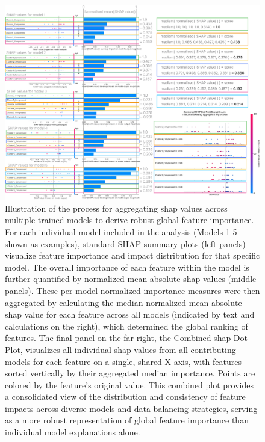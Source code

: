 \documentclass[12pt,a4paper]{report}
\begin{document}
\begin{figure}[h!]
  \centering
  \hspace*{-1.5cm}
  \includegraphics[width=1.2\textwidth]{images/SHAP-aggregate.png}
  \caption[Aggregation of \gls{shap} Values Across Multiple Models]{Illustration of the process for aggregating \gls{shap} values across multiple trained models to derive robust global feature importance. For each individual model included in the analysis (Models 1-5 shown as examples), standard SHAP summary plots (left panels) visualize feature importance and impact distribution for that specific model. The overall importance of each feature within the model is further quantified by normalized mean absolute \gls{shap} values (middle panels). These per-model normalized importance measures were then aggregated by calculating the median normalized mean absolute \gls{shap} value for each feature across all models (indicated by text and calculations on the right), which determined the global ranking of features. The final panel on the far right, the Combined \gls{shap} Dot Plot, visualizes all individual \gls{shap} values from all contributing models for each feature on a single, shared X-axis, with features sorted vertically by their aggregated median importance. Points are colored by the feature's original value. This combined plot provides a consolidated view of the distribution and consistency of feature impacts across diverse models and data balancing strategies, serving as a more robust representation of global feature importance than individual model explanations alone.}
  \label{fig:SHAP-aggregate-explained}
\end{figure}
\end{document}
